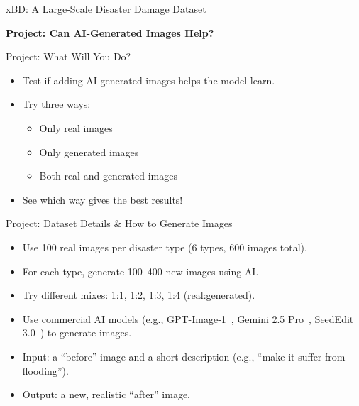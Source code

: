 \begin{refsection}
\begin{frame}{xBD: A Large-Scale Disaster Damage Dataset}
\begin{minipage}{0.55\linewidth}
    \end{minipage}
    \bottomleftrefs
  \end{frame}
\end{refsection}

\begin{frame}
  \centering
  \vspace{2.5cm}
  {\LARGE \textbf{Project: Can AI-Generated Images Help?}}
\end{frame}

\begin{refsection}
\begin{frame}{Project: What Will You Do?}
  \begin{itemize}
    \item Test if adding AI-generated images helps the model learn.
    \item Try three ways:
      \begin{itemize}
        \item Only real images
        \item Only generated images
        \item Both real and generated images
      \end{itemize}
    \item See which way gives the best results!
  \end{itemize}
\end{frame}
\end{refsection}

\begin{refsection}
\begin{frame}{Project: Dataset Details \& How to Generate Images}
  \begin{itemize}
    \item Use 100 real images per disaster type (6 types, 600 images total).
    \item For each type, generate 100–400 new images using AI.
    \item Try different mixes: 1:1, 1:2, 1:3, 1:4 (real:generated).
    \item Use commercial AI models (e.g., GPT-Image-1~\parencite{gptimage1}, Gemini 2.5 Pro~\parencite{geminiteamgoogleGemini25Pushing}, SeedEdit 3.0~\parencite{wang2025seedit}) to generate images.
    \item Input: a “before” image and a short description (e.g., “make it suffer from flooding”).
    \item Output: a new, realistic “after” image.
  \end{itemize}
  \bottomleftrefs
\end{frame}
\end{refsection}

